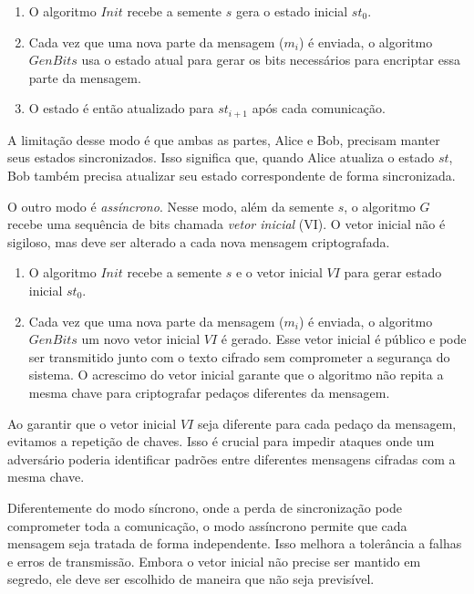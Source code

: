 \begin{enumerate}
    \item O algoritmo $Init$ recebe a semente $s$ gera o estado inicial $st_0$.
    \item Cada vez que uma nova parte da mensagem ($m_i$) é enviada, o algoritmo $GenBits$ usa o estado atual para gerar os bits necessários para encriptar essa parte da mensagem.
    \item O estado é então atualizado para $st_{i+1}$ após cada comunicação.
\end{enumerate}

A limitação desse modo é que ambas as partes, Alice e Bob, precisam manter seus estados sincronizados.
Isso significa que, quando Alice atualiza o estado $st$, Bob também precisa atualizar seu estado correspondente de forma sincronizada.

O outro modo é {\em assíncrono}.
Nesse modo, além da semente $s$, o algoritmo $G$ recebe uma sequência de bits chamada {\em vetor inicial} (VI).
O vetor inicial não é sigiloso, mas deve ser alterado a cada nova mensagem criptografada.

\begin{enumerate}
    \item O algoritmo $Init$ recebe a semente $s$ e o vetor inicial $VI$ para gerar estado inicial $st_0$.
    \item Cada vez que uma nova parte da mensagem ($m_i$) é enviada, o algoritmo $GenBits$ um novo vetor inicial $VI$ é gerado.
      Esse vetor inicial é público e pode ser transmitido junto com o texto cifrado sem comprometer a segurança do sistema.
      O acrescimo do vetor inicial garante que o algoritmo não repita a mesma chave para criptografar pedaços diferentes da mensagem.
\end{enumerate}

Ao garantir que o vetor inicial $VI$ seja diferente para cada pedaço da mensagem, evitamos a repetição de chaves.
Isso é crucial para impedir ataques onde um adversário poderia identificar padrões entre diferentes mensagens cifradas com a mesma chave.

Diferentemente do modo síncrono, onde a perda de sincronização pode comprometer toda a comunicação, o modo assíncrono permite que cada mensagem seja tratada de forma independente.
Isso melhora a tolerância a falhas e erros de transmissão.
Embora o vetor inicial não precise ser mantido em segredo, ele deve ser escolhido de maneira que não seja previsível.


